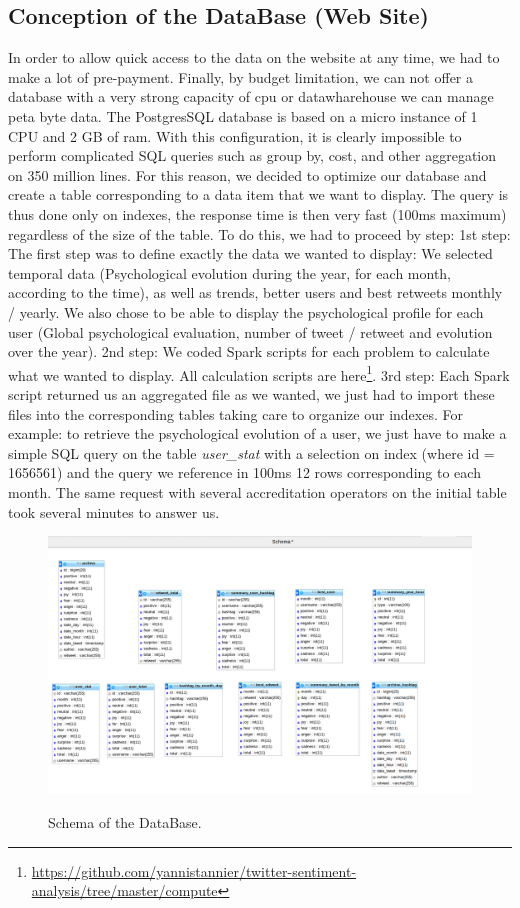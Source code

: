 \documentclass{acmtog} %
\begin{document}
\subsection{Conception of the DataBase (Web Site)}
\label{subsub:conception_db}

In order to allow quick access to the data on the website at any time, we had to make a lot of pre-payment.
Finally, by budget limitation, we can not offer a database with a very strong capacity of cpu or datawharehouse we can manage peta byte data. The PostgresSQL database is based on a micro instance of 1 CPU and 2 GB of ram.
With this configuration, it is clearly impossible to perform complicated SQL queries such as group by, cost, and other aggregation on 350 million lines.
For this reason, we decided to optimize our database and create a table corresponding to a data item that we want to display. The query is thus done only on indexes, the response time is then very fast (100ms maximum) regardless of the size of the table.
To do this, we had to proceed by step:
1st step:
The first step was to define exactly the data we wanted to display: We selected temporal data (Psychological evolution during the year, for each month, according to the time), as well as trends, better users and best retweets monthly / yearly. We also chose to be able to display the psychological profile for each user (Global psychological evaluation, number of tweet / retweet and evolution over the year).
2nd step:
We coded Spark scripts for each problem to calculate what we wanted to display. All calculation scripts are here\footnote{\url{https://github.com/yannistannier/twitter-sentiment-analysis/tree/master/compute}}. 
3rd step:
Each Spark script returned us an aggregated file as we wanted, we just had to import these files into the corresponding tables taking care to organize our indexes.
For example: to retrieve the psychological evolution of a user, we just have to make a simple SQL query on the table {\itshape user\_stat} with a selection on index (where id = 1656561) and the query we reference in 100ms 12 rows corresponding to each month. The same request with several accreditation operators on the initial table took several minutes to answer us.



\begin{figure}[H]
{\includegraphics[width=\linewidth]{table-web-db.png}}
\caption{Schema of the DataBase.}
  \label{fig:archivedb}
\end{figure}
\end{document}
